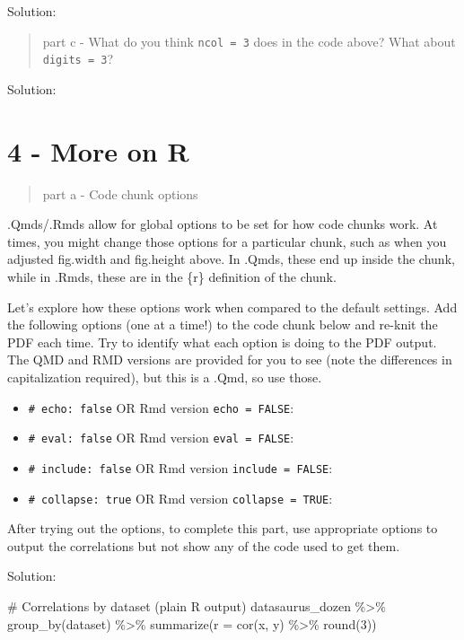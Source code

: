 \documentclass[
  letterpaper,
  DIV=11,
  numbers=noendperiod]{scrartcl}
\newenvironment{Shaded}{\begin{snugshade}}{\end{snugshade}}
\newcommand{\AttributeTok}[1]{\textcolor[rgb]{0.40,0.45,0.13}{#1}}
\newcommand{\CommentTok}[1]{\textcolor[rgb]{0.37,0.37,0.37}{#1}}
\newcommand{\DecValTok}[1]{\textcolor[rgb]{0.68,0.00,0.00}{#1}}
\newcommand{\FunctionTok}[1]{\textcolor[rgb]{0.28,0.35,0.67}{#1}}
\newcommand{\NormalTok}[1]{\textcolor[rgb]{0.00,0.23,0.31}{#1}}
\newcommand{\SpecialCharTok}[1]{\textcolor[rgb]{0.37,0.37,0.37}{#1}}
\providecommand{\tightlist}{%
  \setlength{\itemsep}{0pt}\setlength{\parskip}{0pt}}\usepackage{longtable,booktabs,array}
\begin{document}
Solution:

\begin{quote}
part c - What do you think \texttt{ncol\ =\ 3} does in the code above?
What about \texttt{digits\ =\ 3}?
\end{quote}

Solution:

\newpage

\hypertarget{more-on-r}{%
\section{4 - More on R}\label{more-on-r}}

\begin{quote}
part a - Code chunk options
\end{quote}

.Qmds/.Rmds allow for global options to be set for how code chunks work.
At times, you might change those options for a particular chunk, such as
when you adjusted fig.width and fig.height above. In .Qmds, these end up
inside the chunk, while in .Rmds, these are in the \{r\} definition of
the chunk.

Let's explore how these options work when compared to the default
settings. Add the following options (one at a time!) to the code chunk
below and re-knit the PDF each time. Try to identify what each option is
doing to the PDF output. The QMD and RMD versions are provided for you
to see (note the differences in capitalization required), but this is a
.Qmd, so use those.

\begin{itemize}
\tightlist
\item
  \texttt{\#\textbar{}\ echo:\ false} OR Rmd version
  \texttt{echo\ =\ FALSE}:
\item
  \texttt{\#\textbar{}\ eval:\ false} OR Rmd version
  \texttt{eval\ =\ FALSE}:
\item
  \texttt{\#\textbar{}\ include:\ false} OR Rmd version
  \texttt{include\ =\ FALSE}:
\item
  \texttt{\#\textbar{}\ collapse:\ true} OR Rmd version
  \texttt{collapse\ =\ TRUE}:
\end{itemize}

After trying out the options, to complete this part, use appropriate
options to output the correlations but not show any of the code used to
get them.

Solution:

\begin{Shaded}
\begin{Highlighting}[]
\CommentTok{\# Correlations by dataset (plain R output)}
\NormalTok{datasaurus\_dozen }\SpecialCharTok{\%\textgreater{}\%}
  \FunctionTok{group\_by}\NormalTok{(dataset) }\SpecialCharTok{\%\textgreater{}\%}
  \FunctionTok{summarize}\NormalTok{(}\AttributeTok{r =} \FunctionTok{cor}\NormalTok{(x, y) }\SpecialCharTok{\%\textgreater{}\%} \FunctionTok{round}\NormalTok{(}\DecValTok{3}\NormalTok{)) }
\end{Highlighting}
\end{Shaded}
\end{document}
